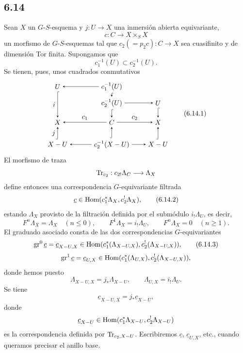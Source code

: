 \subsection*{6.14}
Sean $X$ un $G$-$S$-esquema y $j:U\to X$ una inmersión abierta equivariante,
\[
c:C\to X\times_SX
\]
un morfismo de $G$-$S$-esquemas tal que $c_2(=p_2c):C\to X$ sea cuasifinito y de dimensión Tor finita. Supongamos que
\[
c_1^{-1}(U)\subset c_2^{-1}(U).
\]
Se tienen, pues, unos cuadrados conmutativos
\begin{equation}
\begin{tikzpicture}[baseline=(current bounding box.center),>=stealth]
\node (U1) at (0,3.0) {$U$};
\node (C1U) at (2.8,3.0) {$c_1^{-1}(U)$};
\node (C2U) at (2.8,2.15) {$c_2^{-1}(U)$};
\node (U2) at (5.2,2.15) {$U$};
\node (X1) at (0,1.15) {$X$};
\node (C) at (2.8,1.15) {$C$};
\node (X2) at (5.2,1.15) {$X$};
\node (XU1) at (0,0) {$X-U$};
\node (C2XU) at (2.8,0) {$c_2^{-1}(X-U)$};
\node (XU2) at (5.2,0) {$X-U$};
\draw[->] (C1U) -- (U1);
\draw[{Hooks[right]}->] (C1U) -- (C2U);
\draw[->] (C2U) -- (U2);
\draw[{Hooks[right]}->] (U1) -- node[left] {$i$} (X1);
\draw[{Hooks[right]}->] (U2) -- (X2);
\draw[{Hooks[right]}->] (C2U) -- (C);
\draw[{Hooks[right]}->] (C2XU) -- (C);
\draw[->] (C) -- node[above] {$c_1$} (X1);
\draw[->] (C) -- node[above] {$c_2$} (X2);
\draw[{Hooks[right]}->] (XU1) -- node[left] {$j$} (X1);
\draw[{Hooks[right]}->] (XU2) -- (X2);
\draw[->] (C2XU) -- (XU1);
\draw[->] (C2XU) -- (XU2);
\end{tikzpicture}
\tag{6.14.1}
\end{equation}
El morfismo de traza
\[
\operatorname{Tr}_{c_2}:c_{2!}\Lambda_C\longrightarrow \Lambda_X
\]
define entonces una correspondencia $G$-equivariante filtrada
\begin{equation}
\underline c\in\operatorname{Hom}(c_1^*\Lambda_X,c_2^!\Lambda_X),
\tag{6.14.2}
\end{equation}
estando $\Lambda_X$ provisto de la filtración definida por el submódulo $i_!\Lambda_U$, es decir,
\[
F^n\Lambda_X=\Lambda_X\quad(n\le0),\qquad
F^1\Lambda_X=i_!\Lambda_U,\qquad
F^n\Lambda_X=0\quad(n\ge1).
\]
El graduado asociado consta de las dos correspondencias $G$-equivariantes
\begin{equation}
\operatorname{gr}^0\underline c=\underline c_{X-U,X}
\in\operatorname{Hom}(c_1^*(\Lambda_{X-U,X}),c_2^!(\Lambda_{X-U,X})),
\tag{6.14.3}
\end{equation}
\[
\operatorname{gr}^1\underline c=\underline c_{U,X}
\in\operatorname{Hom}(c_1^*(\Lambda_{U,X}),c_2^!(\Lambda_{X-U,X})),
\]
donde hemos puesto
\[
\Lambda_{X-U,X}=j_*\Lambda_{X-U},\qquad
\Lambda_{U,X}=i_!\Lambda_U.
\]
Se tiene
\begin{equation}
\underline c_{X-U,X}=j_*\underline c_{X-U},
\tag{6.14.4}
\end{equation}
donde
\[
\underline c_{X-U}\in\operatorname{Hom}(c_1^*\Lambda_{X-U},c_2^!\Lambda_{X-U})
\]
es la correspondencia definida por $\operatorname{Tr}_{c_2,X-U}$. Escribiremos $\underline c$, $\underline c_{U,X}$, etc., cuando queramos precisar el anillo base.


